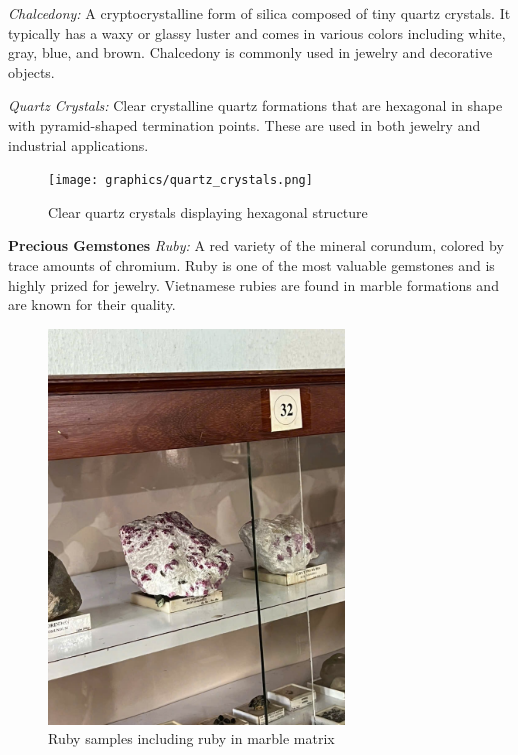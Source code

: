 \textit{Chalcedony:} A cryptocrystalline form of silica composed of tiny quartz crystals. It typically has a waxy or glassy luster and comes in various colors including white, gray, blue, and brown. Chalcedony is commonly used in jewelry and decorative objects.



\textit{Quartz Crystals:} Clear crystalline quartz formations that are hexagonal in shape with pyramid-shaped termination points. These are used in both jewelry and industrial applications.

\begin{figure}[H]
\centering
\texttt{[image: graphics/quartz\_crystals.png]}
\caption{Clear quartz crystals displaying hexagonal structure}
\label{fig:quartz_crystals}
\end{figure}

\textbf{Precious Gemstones}
\textit{Ruby:} A red variety of the mineral corundum, colored by trace amounts of chromium. Ruby is one of the most valuable gemstones and is highly prized for jewelry. Vietnamese rubies are found in marble formations and are known for their quality.

\begin{figure}[H]
\centering
\includegraphics[width=0.7\textwidth]{graphics/ruby.png}
\caption{Ruby samples including ruby in marble matrix}
\label{fig:ruby}
\end{figure}


